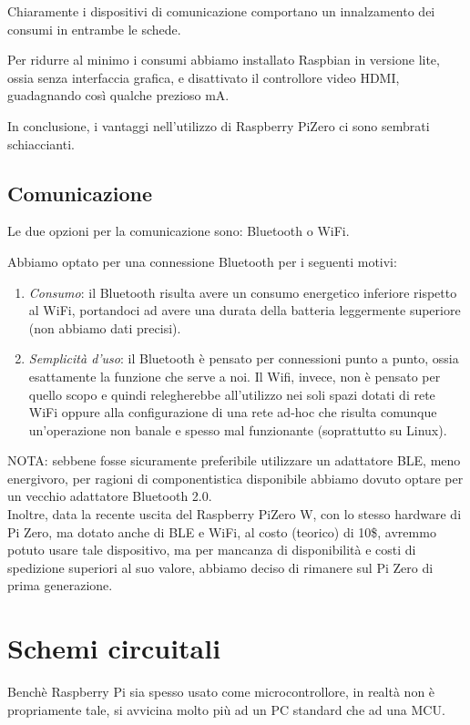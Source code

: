 \documentclass[12pt]{article}
\newcommand{\raspi}{Raspberry Pi}
\newcommand{\raszero} {\raspi Zero}
\begin{document}
Chiaramente i dispositivi di comunicazione comportano un innalzamento dei consumi in entrambe le schede.

Per ridurre al minimo i consumi abbiamo installato Raspbian in versione lite, ossia senza interfaccia grafica, e disattivato il controllore video HDMI, guadagnando così qualche prezioso mA.

In conclusione, i vantaggi nell'utilizzo di \raszero{} ci sono sembrati schiaccianti.

\subsection{Comunicazione}
Le due opzioni per la comunicazione sono: Bluetooth o WiFi.

Abbiamo optato per una connessione Bluetooth per i seguenti motivi:
\begin{enumerate}
\item \emph{Consumo}: il Bluetooth risulta avere un consumo energetico inferiore rispetto al WiFi, portandoci ad avere una durata della batteria leggermente superiore (non abbiamo dati precisi).
\item \emph{Semplicità d'uso}: il Bluetooth è pensato per connessioni punto a punto, ossia esattamente la funzione che serve a noi. Il Wifi, invece, non è pensato per quello scopo e quindi relegherebbe all'utilizzo nei soli spazi dotati di rete WiFi oppure alla configurazione di una rete ad-hoc che risulta comunque un'operazione non banale e spesso mal funzionante (soprattutto su Linux).
\end{enumerate}

\bigskip
\bigskip

NOTA: sebbene fosse sicuramente preferibile utilizzare un adattatore BLE, meno energivoro, per ragioni di componentistica disponibile abbiamo dovuto optare per un vecchio adattatore Bluetooth 2.0.\\
Inoltre, data la recente uscita del \raszero{} W, con lo stesso hardware di Pi Zero, ma dotato anche di BLE e WiFi, al costo (teorico) di 10\$, avremmo potuto usare tale dispositivo, ma per mancanza di disponibilità e costi di spedizione superiori al suo valore, abbiamo deciso di rimanere sul Pi Zero di prima generazione. 

\section{Schemi circuitali}

Benchè \raspi{} sia spesso usato come microcontrollore, in realtà non è propriamente tale, si avvicina molto più ad un PC standard che ad una MCU.
\end{document}
